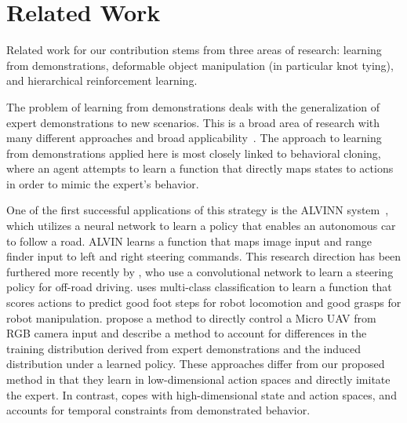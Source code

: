 \section{Related Work}


Related work for our contribution stems from three areas of research:
learning from demonstrations, deformable object manipulation (in particular
knot tying), and hierarchical reinforcement learning.

The problem of learning from demonstrations deals with the generalization of expert demonstrations to new scenarios. 
This is a broad area of research with many different approaches and broad applicability~\cite{Argall_2009, Schaal_1999}.
The approach to learning from demonstrations applied here is most closely linked to behavioral cloning, where an agent attempts to learn a function that directly maps states to actions in order to mimic the expert's behavior. 

One of the first successful applications of this strategy is the ALVINN system~\cite{Pomerleau_NIPS1989}, which utilizes a neural network to learn a policy that enables an autonomous car to follow a road.
ALVIN learns a function that maps image input and range finder input to left and right steering commands. 
This research direction has been furthered more recently by \citet{muller2005off}, who use a convolutional network to learn a steering policy for off-road driving.
\citet{Ratliff_Humanoids2007} uses multi-class classification to learn a function that scores actions to predict good foot steps for robot locomotion and good grasps for robot manipulation.
\citet{Ross_2013} propose a method to directly control a Micro UAV from RGB camera input and describe a method to account for differences in the training distribution derived from expert demonstrations and the induced distribution under a learned policy. 
These approaches differ from our proposed method in that they learn in low-dimensional action spaces and directly imitate the expert.
In contrast, \mmql{} copes with high-dimensional state and action spaces, and accounts for temporal constraints from demonstrated behavior.

